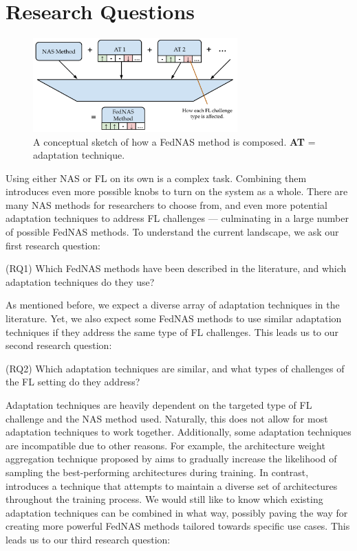 \section{Research Questions}

\begin{figure}[htbp]
  \centering
  \includegraphics[width=0.7\textwidth]{figures/fednas_method_composition.pdf}
  \caption{A conceptual sketch of how a FedNAS method is composed. \textbf{AT} = adaptation technique.}
  \label{fig:fednas_method_composition}
\end{figure}

Using either NAS or FL on its own is a complex task. Combining them introduces even more possible knobs to turn on the system as a whole. There are many NAS methods for researchers to choose from, and even more potential adaptation techniques to address FL challenges — culminating in a large number of possible FedNAS methods. To understand the current landscape, we ask our first research question:

\vspace{1em}
(RQ1) Which FedNAS methods have been described in the literature, and which adaptation techniques do they use?
\vspace{1em}

As mentioned before, we expect a diverse array of adaptation techniques in the literature. Yet, we also expect some FedNAS methods to use similar adaptation techniques if they address the same type of FL challenges. This leads us to our second research question:

\vspace{1em}
(RQ2) Which adaptation techniques are similar, and what types of challenges of the FL setting do they address?
\vspace{1em}

Adaptation techniques are heavily dependent on the targeted type of FL challenge and the NAS method used. Naturally, this does not allow for most adaptation techniques to work together. Additionally, some adaptation techniques are incompatible due to other reasons. For example, the architecture weight aggregation technique proposed by \cite{efnas_2024} aims to gradually increase the likelihood of sampling the best-performing architectures during training. In contrast, \cite{superfednas_2024} introduces a technique that attempts to maintain a diverse set of architectures throughout the training process. We would still like to know which existing adaptation techniques can be combined in what way, possibly paving the way for creating more powerful FedNAS methods tailored towards specific use cases. This leads us to our third research question:

